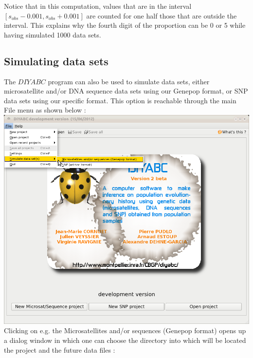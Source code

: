 Notice that in this computation, values that are in the interval $[s_{obs}-0.001,s_{obs}+0.001]$ are counted for one half those that are outside the interval. This explains why the fourth digit of the proportion can be 0 or 5 while having simulated 1000 data sets.

\subsection{Simulating data sets}

The $DIYABC$ program can also be used to simulate data sets, either microsatellite and/or DNA sequence data sets using our Genepop format, or SNP data sets using our specific format. This option is reachable through the main \textsf{File} menu as shown below :\\

\includegraphics[scale=0.33]{gui_pictures/Capture-DIYABC-62.png} \\

Clicking on e.g. the \textsf{Microsatellites and/or sequences (Genepop format)} opens up a dialog window in which one can choose the directory into which will be located the project and the future data files :\\

